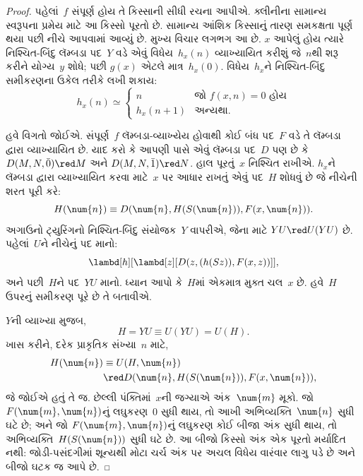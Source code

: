 \begin{proof}
પહેલાં~$f$ સંપૂર્ણ હોય તે કિસ્સાની સીધી રચના આપીએ. ક્લીનીના
સામાન્ય સ્વરૂપના પ્રમેય માટે આ કિસ્સો પૂરતો છે. સામાન્ય આંશિક
કિસ્સાનું તારણ સમકક્ષતા પૂર્ણ થયા પછી નીચે આપવામાં આવ્યું છે.
મુખ્ય વિચાર લગભગ આ છે. $x$ આપેલું હોય ત્યારે નિશ્ચિત-બિંદુ
લૅમ્બડા પદ~$Y$ વડે એવું વિધેય~$h_x(n)$ વ્યાખ્યાયિત કરીશું જે~$n$થી
શરૂ કરીને યોગ્ય~$y$ શોધે; પછી $g(x)$ એટલે માત્ર~$h_x(0)$.
વિધેય~$h_x$ને નિશ્ચિત-બિંદુ સમીકરણના ઉકેલ તરીકે લખી શકાય:
\[
h_x(n) \simeq
\begin{cases}
n & \text{જો $f(x,n) = 0$ હોય} \\
h_x(n+1) & \text{અન્યથા.}
\end{cases}
\]

હવે વિગતો જોઈએ. સંપૂર્ણ~$f$ લૅમ્બડા-વ્યાખ્યેય હોવાથી કોઈ બંધ પદ~$F$
વડે તે લૅમ્બડા દ્વારા વ્યાખ્યાયિત છે. યાદ કરો કે આપણી પાસે એવું લૅમ્બડા
પદ~$D$ પણ છે કે $D(M, N, \bar{0}) \red M$ અને $D(M, N, \bar{1})
\red N$. હાલ પૂરતું~$x$ નિશ્ચિત રાખીએ. $h_x$ને
લૅમ્બડા દ્વારા વ્યાખ્યાયિત કરવા માટે~$x$ પર આધાર રાખતું એવું પદ~$H$
શોધવું છે જે નીચેની શરત પૂરી કરે:
\[
H(\num{n}) \equiv D(\num{n}, H(S(\num{n})), F(x, \num{n})).
\]
અગાઉનો ટ્યુરિંગનો નિશ્ચિત-બિંદુ સંયોજક~$Y$ વાપરીએ, જેના માટે
$YU\red U(YU)$ છે. પહેલાં~$U$ને નીચેનું
પદ માનો:
\[
\lambd[h][\lambd[z][D(z,(h(Sz)),F(x,z))]],
\]
અને પછી~$H$ને પદ~$YU$ માનો. ધ્યાન આપો કે~$H$માં એકમાત્ર મુક્ત
ચલ~$x$ છે. હવે~$H$ ઉપરનું સમીકરણ પૂરે છે તે બતાવીએ.

$Y$ની વ્યાખ્યા મુજબ,
\[
H = YU \equiv U(YU) = U(H).
\]
ખાસ કરીને, દરેક પ્રાકૃતિક સંખ્યા~$n$ માટે,
\begin{align*}
H(\num{n}) & \equiv U(H, \num{n}) \\
& \red D(\num{n}, H(S(\num{n})), F(x, \num{n})),
\end{align*}
જે જોઈએ હતું તે જ. છેલ્લી પંક્તિમાં~$x$ની જગ્યાએ અંક~$\num{m}$
મૂકો. જો $F(\num{m}, \num{n})$નું લઘુકરણ~$\num{0}$ સુધી થાય,
તો આખી અભિવ્યક્તિ~$\num{n}$ સુધી ઘટે છે; અને જો
$F(\num{m}, \num{n})$નું લઘુકરણ કોઈ બીજા અંક સુધી થાય,
તો અભિવ્યક્તિ~$H(S(\num{n}))$ સુધી ઘટે છે.
આ બીજો કિસ્સો અંક એક પૂરતો મર્યાદિત નથી: જોડી-પસંદગીમાં શૂન્યથી
મોટા ચર્ચ અંક પર અચલ વિધેય વારંવાર લાગુ પડે છે અને બીજો ઘટક જ આપે છે.


\end{proof}
